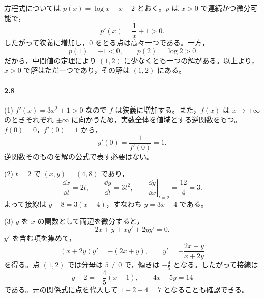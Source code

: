 方程式については $p(x)=\log x+x-2$ とおく。$p$ は $x>0$ で連続かつ微分可能で，
\[
 p'(x)=\frac1x+1>0.
\]
したがって狭義に増加し，$0$ をとる点は高々一つである。一方，
\[
 p(1)=-1<0,\qquad p(2)=\log2>0
\]
だから，中間値の定理により $(1,2)$ に少なくとも一つの解がある。以上より，$x>0$ で解はただ一つであり，その解は $(1,2)$ にある。

\paragraph{2.8}
(1) $f'(x)=3x^2+1>0$ なので $f$ は狭義に増加する。また，$f(x)$ は $x\to\pm\infty$ のときそれぞれ $\pm\infty$ に向かうため，実数全体を値域とする逆関数をもつ。$f(0)=0$，$f'(0)=1$ から，
\[
 g'(0)=\frac1{f'(0)}=1.
\]
逆関数そのものを解の公式で表す必要はない。

(2) $t=2$ で $(x,y)=(4,8)$ であり，
\[
 \frac{\dd x}{\dd t}=2t,\qquad
 \frac{\dd y}{\dd t}=3t^2,\qquad
 \left.\frac{\dd y}{\dd x}\right|_{t=2}
 =\frac{12}{4}=3.
\]
よって接線は $y-8=3(x-4)$，すなわち $y=3x-4$ である。

(3) $y$ を $x$ の関数として両辺を微分すると，
\[
 2x+y+xy'+2yy'=0.
\]
$y'$ を含む項を集めて，
\[
 (x+2y)y'=-(2x+y),\qquad
 y'=-\frac{2x+y}{x+2y}
\]
を得る。点 $(1,2)$ では分母は $5\ne0$ で，傾きは $-\frac45$ となる。したがって接線は
\[
 y-2=-\frac45(x-1),\qquad 4x+5y=14
\]
である。元の関係式に点を代入して $1+2+4=7$ となることも確認できる。
